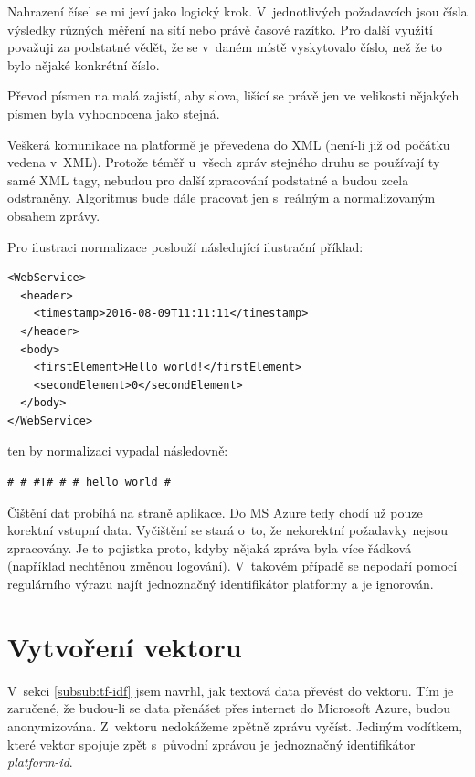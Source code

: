 \documentclass[thesis=M,czech]{FITthesis}[2012/10/20]
\begin{document}
		Nahrazení čísel se mi jeví jako logický krok. V~jednotlivých požadavcích jsou čísla výsledky různých měření na sítí nebo právě časové razítko. Pro další využití považuji za podstatné vědět, že se v~daném místě vyskytovalo číslo, než že to bylo nějaké konkrétní číslo.
		
		Převod písmen na malá zajistí, aby slova, lišící se právě jen ve velikosti nějakých písmen byla vyhodnocena jako stejná.
		
		Veškerá komunikace na platformě je převedena do XML (není-li již od počátku vedena v~XML). Protože téměř u~všech zpráv stejného druhu se používají ty samé XML tagy, nebudou pro další zpracování podstatné a budou zcela odstraněny. Algoritmus bude dále pracovat jen s~reálným a normalizovaným obsahem zprávy. 
		
	 	Pro ilustraci normalizace poslouží následující ilustrační příklad:
	 	
	 	\begin{minipage}{\linewidth}
	 		\begin{lstlisting}[caption={Ilustrační příklad XML požadavku}, label={lst:xml-example}]
<WebService>
  <header>
    <timestamp>2016-08-09T11:11:11</timestamp>
  </header>
  <body>
    <firstElement>Hello world!</firstElement>
    <secondElement>0</secondElement>
  </body>
</WebService>
	 		\end{lstlisting}
	 	\end{minipage}
			
			ten by normalizaci vypadal následovně:
			
			\begin{minipage}{\linewidth}
				\begin{lstlisting}[caption={Ilustrační příklad po normalizaci}, label={lst:xml-example-normalized}]
# # #T# # # hello world #
				\end{lstlisting}
			\end{minipage}
		
		Čištění dat probíhá na straně aplikace. Do MS Azure tedy chodí už pouze korektní vstupní data. Vyčištění se stará o~to, že nekorektní požadavky nejsou zpracovány. Je to pojistka proto, kdyby nějaká zpráva byla více řádková (například nechtěnou změnou logování). V~takovém případě se nepodaří pomocí regulárního výrazu najít jednoznačný identifikátor platformy a  je ignorován.
			
	\section{Vytvoření vektoru}
		\label{sec:construct_vector}
		V~sekci \ref{subsub:tf-idf} jsem navrhl, jak textová data převést do vektoru. Tím je zaručené, že budou-li se data přenášet přes internet do Microsoft Azure, budou anonymizována. Z~vektoru nedokážeme zpětně zprávu vyčíst. Jediným vodítkem, které vektor spojuje zpět s~původní zprávou je jednoznačný identifikátor \textit{platform-id}.
		
\end{document}
